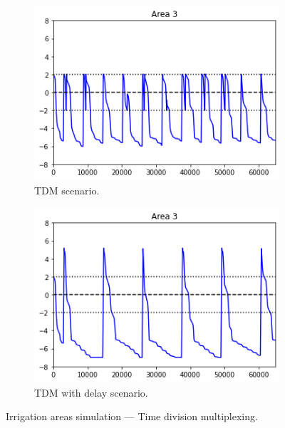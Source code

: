 \documentclass[12pt]{article}
\begin{document}
\begin{figure}[ht]
\centering

\begin{subfigure}[b]{0.475\textwidth}
\centering
\includegraphics[width=\textwidth]{area_tdm}
\caption{TDM scenario.}
\label{fig:area_tdm}
\end{subfigure}
\hfill
\begin{subfigure}[b]{0.475\textwidth}
\centering
\includegraphics[width=\textwidth]{area_tdm_delay}
\caption{TDM with delay scenario.}
\label{fig:area_tdm_delay}
\end{subfigure}

\caption{Irrigation areas simulation — Time division multiplexing.}
\label{fig:areas_3}
\end{figure}
\end{document}
